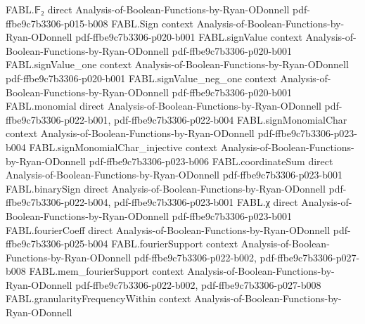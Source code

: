 \begin{theorem}
\label{FABL.exists_DNF_width_truncation_close}
\leanok
{}
\proofstep
  {FABL.𝔽₂}
  {direct}
  {Analysis-of-Boolean-Functions-by-Ryan-ODonnell}
  {pdf-ffbe9c7b3306-p015-b008}
\proofstep
  {FABL.Sign}
  {context}
  {Analysis-of-Boolean-Functions-by-Ryan-ODonnell}
  {pdf-ffbe9c7b3306-p020-b001}
\proofstep
  {FABL.signValue}
  {context}
  {Analysis-of-Boolean-Functions-by-Ryan-ODonnell}
  {pdf-ffbe9c7b3306-p020-b001}
\proofstep
  {FABL.signValue_one}
  {context}
  {Analysis-of-Boolean-Functions-by-Ryan-ODonnell}
  {pdf-ffbe9c7b3306-p020-b001}
\proofstep
  {FABL.signValue_neg_one}
  {context}
  {Analysis-of-Boolean-Functions-by-Ryan-ODonnell}
  {pdf-ffbe9c7b3306-p020-b001}
\proofstep
  {FABL.monomial}
  {direct}
  {Analysis-of-Boolean-Functions-by-Ryan-ODonnell}
  {pdf-ffbe9c7b3306-p022-b001,
    pdf-ffbe9c7b3306-p022-b004}
\proofstep
  {FABL.signMonomialChar}
  {context}
  {Analysis-of-Boolean-Functions-by-Ryan-ODonnell}
  {pdf-ffbe9c7b3306-p023-b004}
\proofstep
  {FABL.signMonomialChar_injective}
  {context}
  {Analysis-of-Boolean-Functions-by-Ryan-ODonnell}
  {pdf-ffbe9c7b3306-p023-b006}
\proofstep
  {FABL.coordinateSum}
  {direct}
  {Analysis-of-Boolean-Functions-by-Ryan-ODonnell}
  {pdf-ffbe9c7b3306-p023-b001}
\proofstep
  {FABL.binarySign}
  {direct}
  {Analysis-of-Boolean-Functions-by-Ryan-ODonnell}
  {pdf-ffbe9c7b3306-p022-b004,
    pdf-ffbe9c7b3306-p023-b001}
\proofstep
  {FABL.χ}
  {direct}
  {Analysis-of-Boolean-Functions-by-Ryan-ODonnell}
  {pdf-ffbe9c7b3306-p023-b001}
\proofstep
  {FABL.fourierCoeff}
  {direct}
  {Analysis-of-Boolean-Functions-by-Ryan-ODonnell}
  {pdf-ffbe9c7b3306-p025-b004}
\proofstep
  {FABL.fourierSupport}
  {context}
  {Analysis-of-Boolean-Functions-by-Ryan-ODonnell}
  {pdf-ffbe9c7b3306-p022-b002,
    pdf-ffbe9c7b3306-p027-b008}
\proofstep
  {FABL.mem_fourierSupport}
  {context}
  {Analysis-of-Boolean-Functions-by-Ryan-ODonnell}
  {pdf-ffbe9c7b3306-p022-b002,
    pdf-ffbe9c7b3306-p027-b008}
\proofstep
  {FABL.granularityFrequencyWithin}
  {context}
  {Analysis-of-Boolean-Functions-by-Ryan-ODonnell}

\end{theorem}
